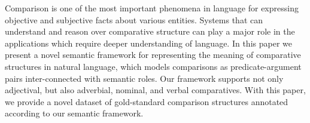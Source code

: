 Comparison is one of the most important phenomena in language for expressing objective and subjective facts about various entities. Systems that can understand and reason over comparative structure can play a major role in the applications which require deeper understanding of language. In this paper we present a novel semantic framework for representing the meaning of comparative structures in natural language, which models comparisons as predicate-argument pairs inter-connected with semantic roles. Our framework supports not only adjectival, but also adverbial, nominal, and verbal comparatives. With this paper, we provide a novel dataset of gold-standard comparison structures annotated according to our semantic framework.
